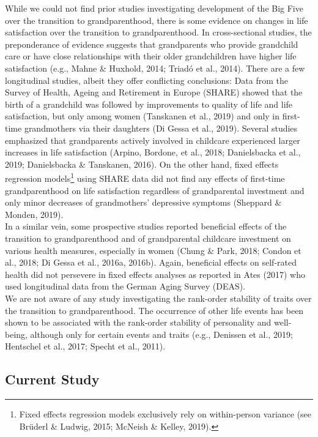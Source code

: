 \documentclass[
  english,
  man, noextraspace]{apa7}
\begin{document}
While we could not find prior studies investigating development of the Big Five over the transition to grandparenthood, there is some evidence on changes in life satisfaction over the transition to grandparenthood. In cross-sectional studies, the preponderance of evidence suggests that grandparents who provide grandchild care or have close relationships with their older grandchildren have higher life satisfaction (e.g., Mahne \& Huxhold, 2014; Triadó et al., 2014). There are a few longitudinal studies, albeit they offer conflicting conclusions: Data from the Survey of Health, Ageing and Retirement in Europe (SHARE) showed that the birth of a grandchild was followed by improvements to quality of life and life satisfaction, but only among women (Tanskanen et al., 2019) and only in first-time grandmothers via their daughters (Di Gessa et al., 2019). Several studies emphasized that grandparents actively involved in childcare experienced larger increases in life satisfaction (Arpino, Bordone, et al., 2018; Danielsbacka et al., 2019; Danielsbacka \& Tanskanen, 2016). On the other hand, fixed effects regression models\footnote{Fixed effects regression models exclusively rely on within-person variance (see Brüderl \& Ludwig, 2015; McNeish \& Kelley, 2019).} using SHARE data did not find any effects of first-time grandparenthood on life satisfaction regardless of grandparental investment and only minor decreases of grandmothers' depressive symptoms (Sheppard \& Monden, 2019).\\
In a similar vein, some prospective studies reported beneficial effects of the transition to grandparenthood and of grandparental childcare investment on various health measures, especially in women (Chung \& Park, 2018; Condon et al., 2018; Di Gessa et al., 2016a, 2016b). Again, beneficial effects on self-rated health did not persevere in fixed effects analyses as reported in Ates (2017) who used longitudinal data from the German Aging Survey (DEAS). \\
We are not aware of any study investigating the rank-order stability of traits over the transition to grandparenthood. The occurrence of other life events has been shown to be associated with the rank-order stability of personality and well-being, although only for certain events and traits (e.g., Denissen et al., 2019; Hentschel et al., 2017; Specht et al., 2011).

\hypertarget{current-study}{%
\subsection{Current Study}\label{current-study}}
\end{document}
